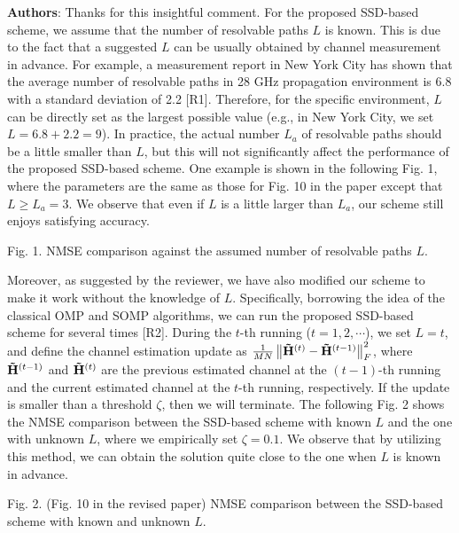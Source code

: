 \documentclass[a4paper,12pt]{article}
\begin{document}
{\color{blue} \textbf{Authors}: Thanks for this insightful comment. For the proposed SSD-based scheme, we assume that the number of resolvable paths ${L}$ is known. This is due to the fact that a suggested ${L}$ can be usually obtained by channel measurement in advance. For example, a measurement report in New York City has shown that the average number of resolvable paths in 28 GHz propagation environment is 6.8 with a standard deviation of 2.2 [R1]. Therefore, for the specific environment, ${L}$ can be directly set as the largest possible value (e.g., in New York City, we set ${L = 6.8+2.2 = 9}$). In practice, the actual number ${L_a}$ of resolvable paths should be a little smaller than ${L}$, but this will not significantly affect the performance of the proposed SSD-based scheme. One example is shown in the following Fig. 1, where the parameters are the same as those for Fig. 10 in the paper except that ${L \ge L_a = 3}$. We observe that even if ${L}$ is a little larger than ${L_a}$, our scheme still enjoys satisfying accuracy.


Fig. 1. NMSE comparison against the assumed number of resolvable paths ${L}$.


Moreover, as suggested by the reviewer, we have also modified our scheme to make it work without the knowledge of ${L}$. Specifically, borrowing the idea of the classical OMP and SOMP algorithms, we can run the proposed SSD-based scheme for several times [R2]. During the ${t}$-th running (${t = 1,2, \cdots }$), we set ${L = t}$, and define the channel estimation update as ${\frac{1}{{MN}}\left\| {{{{\bf{\tilde H}}}^{\left( t \right)}} - {{{\bf{\tilde H}}}^{\left( {t - 1} \right)}}} \right\|_F^2}$, where ${{{{{\bf{\tilde H}}}^{\left( {t - 1} \right)}}}}$ and ${{{{{\bf{\tilde H}}}^{\left( t \right)}}}}$ are the previous estimated channel at the ${\left( {t - 1} \right)}$-th running and the current estimated channel at the ${t}$-th running, respectively. If the update is smaller than a threshold ${\zeta }$, then we will terminate. The following Fig. 2 shows the NMSE comparison between the SSD-based scheme with known ${L}$ and the one with unknown ${L}$, where we empirically set ${\zeta = 0.1}$. We observe that by utilizing this method, we can obtain the solution quite close to the one when ${L}$ is known in advance.

Fig. 2. (Fig. 10 in the revised paper) NMSE comparison between the SSD-based scheme with known and unknown ${L}$.

}
\end{document}
